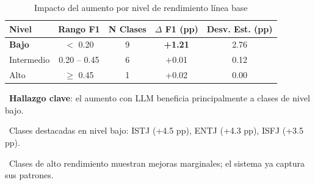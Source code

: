 \begin{table}[htbp]
\centering
\caption{Impacto del aumento por nivel de rendimiento línea base}
\label{tab:tier_impact}
\begin{tabular}{lcccc}
\toprule
\textbf{Nivel} & \textbf{Rango F1} & \textbf{N Clases} & \textbf{$\Delta$ F1 (pp)} & \textbf{Desv. Est. (pp)} \\
\midrule
\rowcolor{green!20}
\textbf{Bajo} & $<$ 0.20 & 9 & \textbf{+1.21} & 2.76 \\
Intermedio & 0.20 -- 0.45 & 6 & +0.01 & 0.12 \\
Alto & $\geq$ 0.45 & 1 & +0.02 & 0.00 \\
\bottomrule
\end{tabular}
\vspace{0.5em}\footnotesize

\textbullet\ \textbf{Hallazgo clave}: el aumento con LLM beneficia principalmente a clases de nivel bajo.

\textbullet\ Clases destacadas en nivel bajo: ISTJ (+4.5 pp), ENTJ (+4.3 pp), ISFJ (+3.5 pp).

\textbullet\ Clases de alto rendimiento muestran mejoras marginales; el sistema ya captura sus patrones.

\end{table}
